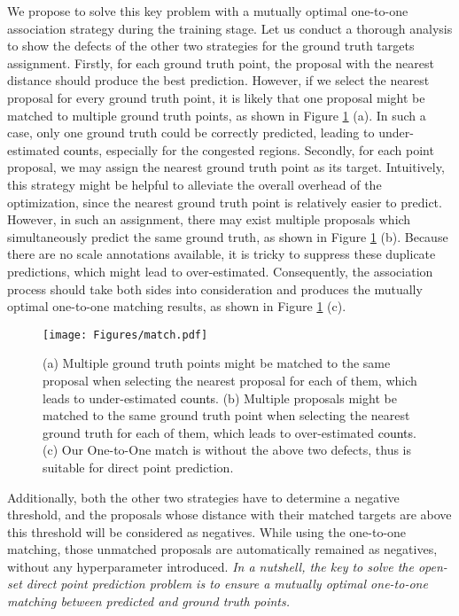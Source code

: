 \documentclass[10pt,twocolumn,letterpaper]{article}
\newcommand{\ywu}[1]{\textcolor{black}{#1}}
\begin{document}
We propose to solve this key problem with a mutually optimal one-to-one association strategy during the training stage. Let us conduct a thorough analysis to show the defects of the other two strategies for the ground truth targets assignment. Firstly, for each ground truth point, the proposal with the nearest distance should produce the best prediction. However, if we select the nearest proposal for every ground truth point, it is likely that one proposal might be matched to multiple ground truth points, as shown in Figure \ref{fig3} (a). In such a case, only one ground truth could be correctly predicted, leading to under-estimated \ywu{counts}, especially for the congested regions. Secondly, for each point proposal, we may assign the nearest ground truth point as its target. Intuitively, this strategy might be helpful to alleviate the overall overhead of the optimization, since the nearest ground truth point is relatively easier to predict. However, in such an assignment, there may exist multiple proposals which simultaneously predict the same ground truth, as shown in Figure \ref{fig3} (b). Because there are no scale annotations available, it is tricky to suppress these duplicate predictions, which might lead to over-estimated. 
Consequently, the association process should take both sides into consideration and produces the mutually optimal one-to-one matching results, as shown in Figure \ref{fig3} (c).
\begin{figure}[t!]
    \centering
    \texttt{[image: Figures/match.pdf]}
    \caption{(a) Multiple ground truth points might be matched to the same proposal when selecting the nearest proposal for each of them, which leads to under-estimated \ywu{counts}. (b) Multiple proposals might be matched to the same ground truth point when selecting the nearest ground truth for each of them, which leads to over-estimated \ywu{counts}. (c) Our One-to-One match is without the above two defects, thus is suitable for direct point prediction. }
    \label{fig3}
    \vspace{-1.5em}
\end{figure}

Additionally, both the other two strategies have to determine a negative threshold, and the proposals whose distance with their matched targets are above this threshold will be considered as negatives. While using the one-to-one matching, those unmatched proposals are automatically remained as negatives, without any hyperparameter introduced. \textit{In a nutshell, the key to solve the open-set direct point prediction problem is to ensure a mutually optimal one-to-one matching between predicted and ground truth points.} 
\end{document}
